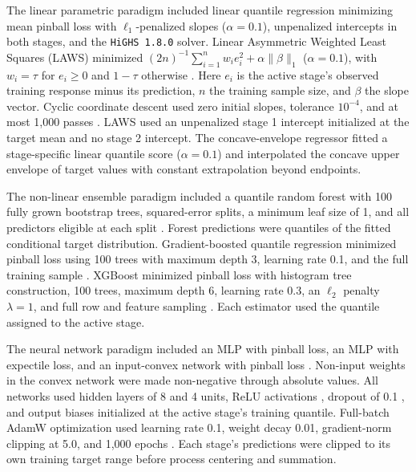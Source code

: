 \documentclass{article}
\begin{document}
The linear parametric paradigm included linear quantile regression \citep{ref22} minimizing mean pinball loss with $\ell_1$-penalized slopes ($\alpha = 0.1$), unpenalized intercepts in both stages, and the \texttt{HiGHS 1.8.0} solver. Linear Asymmetric Weighted Least Squares (LAWS) minimized $(2n)^{-1}\sum_{i=1}^{n} w_i e_i^2 + \alpha\lVert\beta\rVert_1$ ($\alpha = 0.1$), with $w_i = \tau$ for $e_i \ge 0$ and $1-\tau$ otherwise \citep{ref36}. Here $e_i$ is the active stage's observed training response minus its prediction, $n$ the training sample size, and $\beta$ the slope vector. Cyclic coordinate descent used zero initial slopes, tolerance $10^{-4}$, and at most 1,000 passes \citep{ref76}. LAWS used an unpenalized stage 1 intercept initialized at the target mean and no stage 2 intercept. The concave-envelope regressor fitted a stage-specific linear quantile score ($\alpha = 0.1$) and interpolated the concave upper envelope of target values with constant extrapolation beyond endpoints.

The non-linear ensemble paradigm included a quantile random forest with 100 fully grown bootstrap trees, squared-error splits, a minimum leaf size of 1, and all predictors eligible at each split \citep{ref37}. Forest predictions were quantiles of the fitted conditional target distribution. Gradient-boosted quantile regression minimized pinball loss using 100 trees with maximum depth 3, learning rate 0.1, and the full training sample \citep{ref38}. XGBoost minimized pinball loss with histogram tree construction, 100 trees, maximum depth 6, learning rate 0.3, an $\ell_2$ penalty $\lambda = 1$, and full row and feature sampling \citep{ref39}. Each estimator used the quantile assigned to the active stage.

The neural network paradigm included an MLP with pinball loss, an MLP with expectile loss, and an input-convex network with pinball loss \citep{ref40}. Non-input weights in the convex network were made non-negative through absolute values. All networks used hidden layers of 8 and 4 units, ReLU activations \citep{ref80}, dropout of 0.1 \citep{ref77}, and output biases initialized at the active stage's training quantile. Full-batch AdamW optimization used learning rate 0.1, weight decay 0.01, gradient-norm clipping at 5.0, and 1,000 epochs \citep{ref41}. Each stage's predictions were clipped to its own training target range before process centering and summation.
\end{document}
